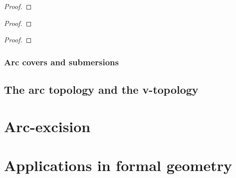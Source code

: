                 \begin{proposition} \label{prop: the_v_topology_for_schemes}
                    
                \end{proposition}
                    \begin{proof}
                        
                    \end{proof}
                \begin{definition}[h-covers] \label{def: h_covers_for_schemnes}
                    
                \end{definition}
                \begin{proposition} \label{prop: the_h_topology_for_schemes}
                    
                \end{proposition}
                    \begin{proof}
                        
                    \end{proof}
                \begin{proposition} \label{prop: comparing_the_v_and_h_topologies}
                    
                \end{proposition}
                    \begin{proof}
                        
                    \end{proof}
            
            \subsubsection{Arc covers and submersions}
            
        \subsection{The arc topology and the v-topology}
    
    \section{Arc-excision}
    
    \section{Applications in formal geometry}